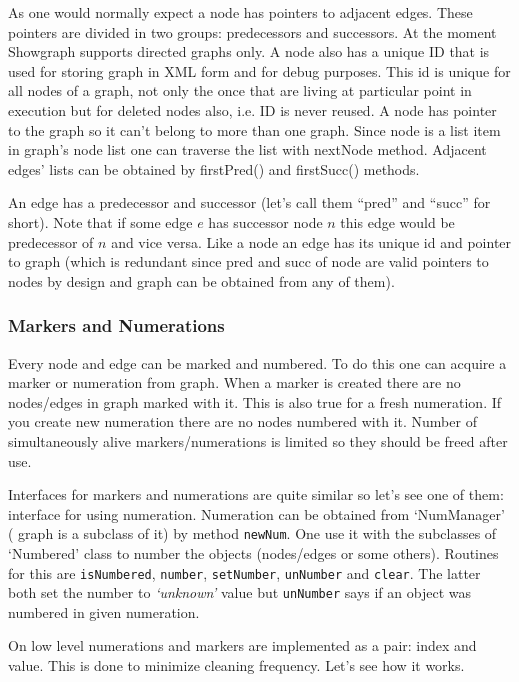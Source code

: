 \documentclass[11pt,a4paper]{article}
\begin{document}
As one would normally expect a node has pointers to adjacent edges. These pointers are divided in two groups: predecessors and successors. At the moment Showgraph supports directed graphs only. A node also has a unique ID that is used for storing graph in XML form and for debug purposes. This id is unique for all nodes of a graph, not only the once that are living at particular point in execution but for deleted nodes also, i.e. ID is never reused. A node has pointer to the graph so it can't belong to more than one graph. Since node is a list item in graph's node list one can traverse the list with nextNode method. Adjacent edges' lists can be obtained by firstPred() and firstSucc() methods.

An edge has a predecessor and successor (let's call them ``pred'' and ``succ'' for short). Note that if some edge $e$ has successor node $n$ this edge would be predecessor of $n$ and vice versa. Like a node an edge has its unique id and pointer to graph (which is redundant since pred and succ of node are valid pointers to nodes by design and graph can be obtained from any of them).

\subsubsection{Markers and Numerations}
Every node and edge can be marked and numbered. To do this one can acquire a marker or numeration from graph. When a marker is created there are no nodes/edges in graph marked with it. This is also true for a fresh numeration. If you create new numeration there are no nodes numbered with it. Number of simultaneously alive markers/numerations is limited so they should be freed after use.

Interfaces for markers and numerations are quite similar so let's see one of them: interface for using numeration. Numeration can be obtained from `NumManager' ( graph is a subclass of it) by method \lstinline{newNum}. One use it with the subclasses of `Numbered' class to number the objects (nodes/edges or some others). Routines for this are \lstinline{isNumbered}, \lstinline{number}, \lstinline{setNumber}, \lstinline{unNumber} and \lstinline{clear}. The latter both set the number to \emph{`unknown'} value but \lstinline{unNumber} says if an object was numbered in given numeration.

On low level numerations and markers are implemented as a pair: index and value. This is done to minimize cleaning frequency. Let's see how it works.
\end{document}
